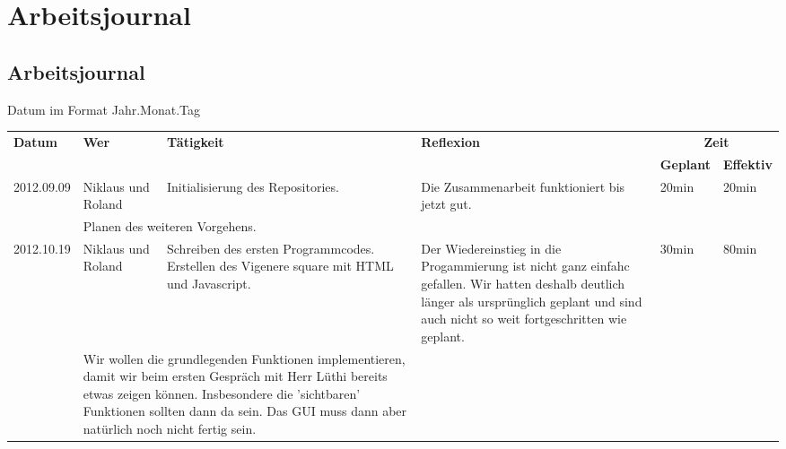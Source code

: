 \documentclass[11pt,paper=a4,final]{scrartcl}
\begin{document}
\section{Arbeitsjournal}
\begin{landscape}
  \section{Arbeitsjournal}
  Datum im Format Jahr.Monat.Tag
  \begin{longtable}{|p{1.8cm}|p{1.5cm}|p{5.0cm}|p{11.0cm}|l|l|}
    \hline
    \multirow{2}{*}{\bf Datum} & \multirow{2}{*}{\bf Wer} &\multirow{2}{*}{\bf T\"atigkeit} & \multirow{2}{*}{\bf Reflexion} & \multicolumn{2}{c|}{\bf Zeit} \\ \cline{5-6}
     & & & & \bf Geplant & \bf Effektiv \\ \hline
    \hline
    \endhead
    2012.09.09 & Niklaus und Roland &
    Initialisierung des Repositories. &
    Die Zusammenarbeit funktioniert bis jetzt gut. &
    20min & 20min \\ \hline \nopagebreak
    \multicolumn{2}{|l|}{\bf Pendenzen} &\multicolumn{2}{p{16.0cm}|}{Planen des weiteren Vorgehens.}  & \multicolumn{2}{l|}{} \\ \hline
    \hline
    2012.10.19 & Niklaus und Roland &
    Schreiben des ersten Programmcodes. Erstellen des Vigenere square mit HTML und Javascript. &
    Der Wiedereinstieg in die Progammierung ist nicht ganz einfahc gefallen. Wir hatten deshalb deutlich l\"anger als urspr\"unglich geplant und sind auch nicht so weit fortgeschritten wie geplant. &
    30min & 80min \\ \hline \nopagebreak
    \multicolumn{2}{|l|}{\bf Pendenzen} &\multicolumn{2}{p{16.0cm}|}{Wir wollen die grundlegenden Funktionen implementieren, damit wir beim ersten Gespr\"ach mit Herr L\"uthi bereits etwas zeigen k\"onnen. Insbesondere die 'sichtbaren' Funktionen sollten dann da sein. Das GUI muss dann aber nat\"urlich noch nicht fertig sein.}  & \multicolumn{2}{l|}{} \\ \hline

\end{longtable}
\end{landscape}
\end{document}
